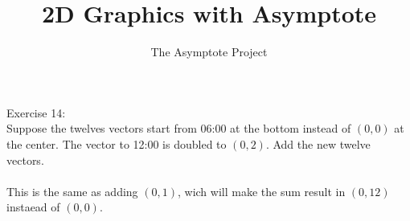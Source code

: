 \documentclass[12pt]{article}
\title{2D Graphics with Asymptote}
\author{The Asymptote Project}
\begin{document}
	Exercise 14:\\
	Suppose the twelves vectors start from 06:00 at the bottom instead of $(0,0)$ at the center. The vector to 12:00 is doubled to $(0,2)$. Add the new twelve vectors.\\
	\\
	This is the same as adding $(0,1)$, wich will make the sum result in $(0,12)$ instaead of $(0,0)$.
\end{document}
